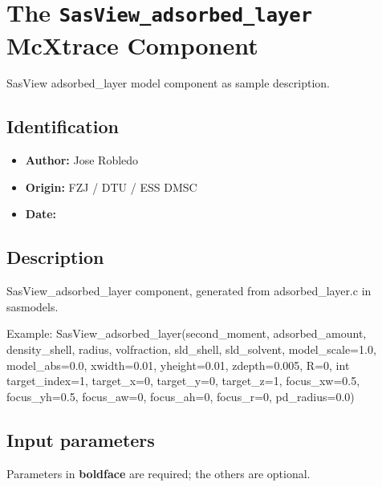 \section{The \texttt{SasView\_adsorbed\_layer} McXtrace Component}
SasView adsorbed\_layer model component as sample description.

\subsection*{Identification}
\begin{itemize}
  \item \textbf{Author:} Jose Robledo
  \item \textbf{Origin:} FZJ / DTU / ESS DMSC
  \item \textbf{Date:} 
\end{itemize}

\subsection*{Description}
SasView\_adsorbed\_layer component, generated from adsorbed\_layer.c in sasmodels.

Example: SasView\_adsorbed\_layer(second\_moment, adsorbed\_amount, density\_shell, radius, volfraction, sld\_shell, sld\_solvent, model\_scale=1.0, model\_abs=0.0, xwidth=0.01, yheight=0.01, zdepth=0.005, R=0, int target\_index=1, target\_x=0, target\_y=0, target\_z=1, focus\_xw=0.5, focus\_yh=0.5, focus\_aw=0, focus\_ah=0, focus\_r=0, pd\_radius=0.0)

\subsection*{Input parameters}
Parameters in \textbf{boldface} are required; the others are optional.

